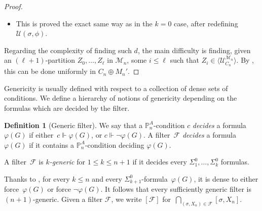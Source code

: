\documentclass{article}
\def\NN{\mathbb{N}}
\def\PP{\mathbb{P}}
\def\F{\mathcal{F}}
\def\U{\mathcal{U}}
\def\M{\mathcal{M}}
\def\PP{\mathbb{P}}
\newcommand{\nqvdash}{\operatorname{{?}{\nvdash}}}
\numberwithin{theorem}{section}
\theoremstyle{definition}
\newtheorem{definition}[theorem]{Definition}
\begin{document}
\begin{proof}
\begin{itemize}
    
     By , $A \cap X_n \in \langle \U_{C_n}^{\M_n}\rangle$, hence there exists some $\rho \subseteq X_n \cap A$ and some $a \in \NN$ such that $\sigma \cup \rho \nqvdash \neg \phi(G,a)$. By induction hypothesis, there exists $ d \leq (\sigma \cup \rho, X_n \setminus \{0, \dots, |\rho|-1\}) \leq c$  such that $d \Vdash \phi(G,a)$, hence, $d \Vdash (\exists x) \phi(G,x)$. 

    \item 
    This is proved the exact same way as in the $k =0$ case, after redefining $\U(\sigma,\phi)$.
\end{itemize}
Regarding the complexity of finding such $d$, the main difficulty is finding, given an $(\ell+1)$-partition $Z_0, \dots, Z_\ell$ in $\M_n$, some $i\leq \ell$ such that $Z_i \in \langle \U_{C_n}^{\M_n} \rangle$. By , this can be done uniformly in $C_n \oplus M_n'$.
\end{proof}

Genericity is usually defined with respect to a collection of dense sets of conditions. We define a hierarchy of notions of genericity depending on the formulas which are decided by the filter.

\begin{definition}[Generic filter]
We say that a $\PP^A_n$-condition $c$ \emph{decides} a formula~$\varphi(G)$ if either~$c \Vdash \varphi(G)$, or $c \Vdash \neg \varphi(G)$. A filter~$\F$ \emph{decides} a formula~$\varphi(G)$ if it contains a $\PP^A_n$-condition deciding $\varphi(G)$.

A filter~$\F$ is \emph{$k$-generic} for $1 \leq k \leq n+1$ if it decides every $\Sigma^0_1, \dots, \Sigma^0_k$ formulas.
\end{definition}

Thanks to , for every $k \leq n$ and every $\Sigma^0_{k+1}$-formula~$\varphi(G)$, it is dense to either force~$\varphi(G)$ or force $\neg \varphi(G)$. It follows that every sufficiently generic filter is $(n+1)$-generic. Given a filter $\F$, we write $[\F]$ for~$\bigcap_{(\sigma, X_n) \in \F} [\sigma,X_n]$.
\end{document}
